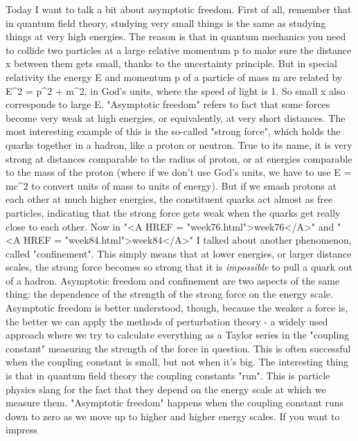 


Today I want to talk a bit about asymptotic freedom.
First of all, remember that in quantum field theory, studying
very small things is the same as studying things at very high
energies.  The reason is that in quantum mechanics you need to
collide two particles at a large relative momentum p to make sure 
the distance x between them gets small, thanks to the uncertainty 
principle.  But in special relativity the energy E and momentum p 
of a particle of mass m are related by
                    E^{2} = p^{2} + m^{2},
in God's units, where the speed of light is 1.  So small x also 
corresponds to large E.   
"Asymptotic freedom" refers to fact that some forces
become very weak at high energies, or equivalently, at very short
distances.   The most interesting example of this is the so-called
"strong force", which holds the quarks together in a hadron, like a
proton or neutron.  True to its name, it is very strong at distances
comparable to the radius of proton, or at energies comparable to the
mass of the proton (where if we don't use God's units, we have to use 
E = mc^2 to convert units of mass to units of energy).  But if we smash 
protons at each other at much higher energies, the constituent quarks act 
almost as free particles, indicating that the strong force gets weak when 
the quarks get really close to each other.   
Now in "<A HREF = "week76.html">week76</A>"
and "<A HREF = "week84.html">week84</A>"
I talked about another phenomenon, called
"confinement".  This simply means that at lower energies, or larger
distance scales, the strong force becomes so strong that it is
\emph{impossible} to pull a quark out of a hadron.  Asymptotic freedom and
confinement are two aspects of the same thing: the dependence of 
the strength of the strong force on the energy scale.  Asymptotic 
freedom is better understood, though, because the weaker a force is, 
the better we can apply the methods of perturbation theory - a widely 
used approach where we try to calculate everything as a Taylor series in 
the "coupling constant" measuring the strength of the force in question.
This is often successful when the coupling constant is small, but not
when it's big.
The interesting thing is that in quantum field theory the coupling 
constants "run".  This is particle physics slang for the fact that 
they depend on the energy scale at which we measure them.  "Asymptotic 
freedom" happens when the coupling constant runs down to zero as we 
move up to higher and higher energy scales.  If you want to impress 
